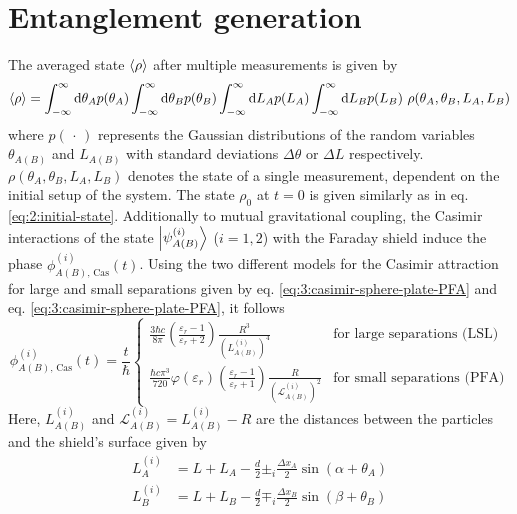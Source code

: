 \section{Entanglement generation}\label{sec:4:entanglement-generation}
The averaged state $\left\langle\rho\right\rangle$ after multiple measurements is given by
\begin{equation}\label{eq:4:average-density}
  \left\langle\rho\right\rangle = \int_{-\infty}^{\infty} \dd \theta_A p(\theta_A) \int_{-\infty}^{\infty} \dd \theta_B p(\theta_B) \int_{-\infty}^{\infty} \dd L_A p(L_A) \int_{-\infty}^{\infty} \dd L_B p(L_B) \ \rho(\theta_A, \theta_B, L_A, L_B)
\end{equation} 
where $p(\,\cdot\,)$ represents the Gaussian distributions of the random variables 
$\theta_{A(B)}$ and $L_{A(B)}$ with standard deviations $\Delta \theta$ or $\Delta L$ respectively. 
$\rho(\theta_A, \theta_B, L_A, L_B)$ denotes the state of a single measurement, dependent on the initial setup of the system.
The state $\rho_0$ at $t=0$ is given similarly as in eq. \eqref{eq:2:initial-state}.
Additionally to mutual gravitational coupling, the Casimir interactions of the state $\ket{\psi^{(i)}_{A(B)}}$ ($i = 1, 2$) with the Faraday shield induce the phase $\phi^{(i)}_{A(B),\,\mathrm{Cas}}(t)$.
Using the two different models for the Casimir attraction for large and small separations given by eq. \eqref{eq:3:casimir-sphere-plate-PFA} and eq. \eqref{eq:3:casimir-sphere-plate-PFA}, it follows
\begin{equation}
  \phi^{(i)}_{A(B),\,\mathrm{Cas}}(t) = \frac{t}{\hbar}
  \begin{cases}
     \frac{3 \hbar c}{8 \pi} \left(\frac{\varepsilon_r - 1}{\varepsilon_r + 2}\right) \frac{R^3}{(L^{(i)}_{A(B)})^4} & \text{for large separations (LSL)} \\
    \frac{\hbar c \pi^3}{720} \varphi(\varepsilon_r) \left(\frac{\varepsilon_r - 1}{\varepsilon_r + 1}\right) \frac{R}{(\mathscr{L}^{(i)}_{A(B)})^2} & \text{for small separations (PFA)}
  \end{cases}
\end{equation}
Here, $L^{(i)}_{A(B)}$ and $\mathscr{L}^{(i)}_{A(B)} = L^{(i)}_{A(B)}-R$ are the  distances between the particles and the shield's surface given by
\begin{align}\label{eq:4:L-casimir}
  L^{(i)}_{A} &= L + L_{A} - \frac{d}{2} \pm_i \frac{\Delta x_{A}}{2} \sin(\alpha + \theta_{A}) \\
  L^{(i)}_{B} &= L + L_{B} - \frac{d}{2} \mp_i \frac{\Delta x_{B}}{2} \sin(\beta + \theta_{B})
\end{align}

